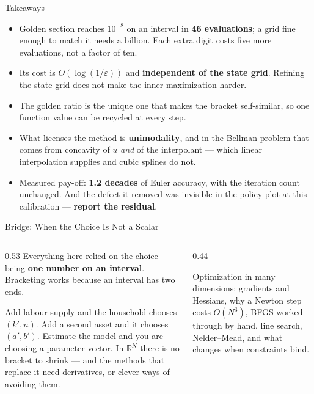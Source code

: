\begin{frame}{Takeaways}
\begin{takeawaybox}
\begin{itemize}\small
  \item Golden section reaches $10^{-8}$ on an interval in \textbf{46 evaluations}; a grid fine enough to match it needs a billion. Each extra digit costs five more evaluations, not a factor of ten.
  \item Its cost is $O(\log(1/\varepsilon))$ and \textbf{independent of the state grid}. Refining the state grid does not make the inner maximization harder.
  \item The golden ratio is the unique one that makes the bracket self-similar, so one function value can be recycled at every step.
  \item What licenses the method is \textbf{unimodality}, and in the Bellman problem that comes from concavity of $u$ \emph{and} of the interpolant --- which linear interpolation supplies and cubic splines do not.
  \item Measured pay-off: \textbf{1.2 decades} of Euler accuracy, with the iteration count unchanged. And the defect it removed was invisible in the policy plot at this calibration --- \textbf{report the residual}.
\end{itemize}
\end{takeawaybox}
\end{frame}

\begin{frame}{Bridge: When the Choice Is Not a Scalar}
\begin{columns}[T]
\begin{column}{0.53\textwidth}
\small
Everything here relied on the choice being \textbf{one number on an interval}. Bracketing works because an interval has two ends.
\medskip

Add labour supply and the household chooses $(k',n)$. Add a second asset and it chooses $(a',b')$. Estimate the model and you are choosing a parameter vector. In $\mathbb{R}^{N}$ there is no bracket to shrink --- and the methods that replace it need derivatives, or clever ways of avoiding them.
\end{column}
\begin{column}{0.44\textwidth}
\begin{conceptbox}[title=\textbf{Next (4.A3)}]\small
Optimization in many dimensions: gradients and Hessians, why a Newton step costs $O(N^{3})$, BFGS worked through by hand, line search, Nelder--Mead, and what changes when constraints bind.
\end{conceptbox}
\end{column}
\end{columns}
\end{frame}


